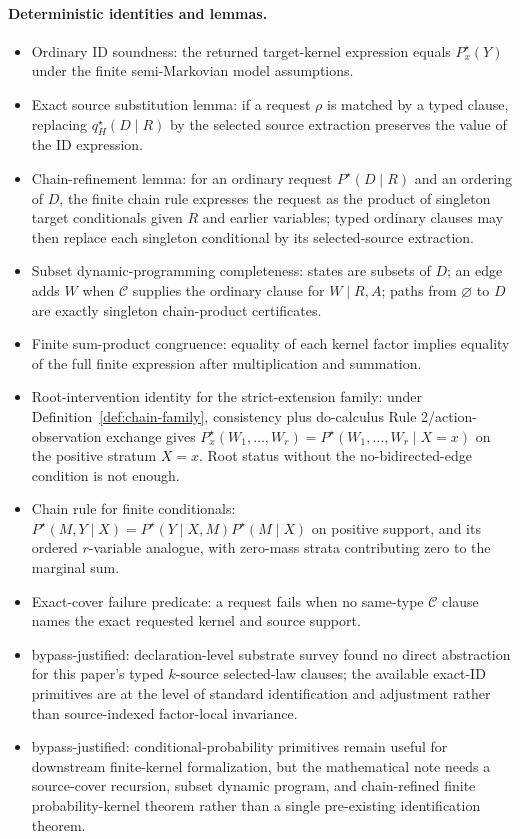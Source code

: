 \documentclass[11pt]{article}
\theoremstyle{definition}
\theoremstyle{plain}
\theoremstyle{remark}
\begin{document}
\paragraph{Deterministic identities and lemmas.}
\begin{itemize}[leftmargin=*]
\item Ordinary ID soundness: the returned target-kernel expression equals
\(P^\star_x(Y)\) under the finite semi-Markovian model assumptions.
\item Exact source substitution lemma: if a request \(\rho\) is matched by a
typed clause, replacing \(q^\star_H(D\mid R)\) by the selected source
extraction preserves the value of the ID expression.
\item Chain-refinement lemma: for an ordinary request \(P^\star(D\mid R)\)
and an ordering of \(D\), the finite chain rule expresses the request as the
product of singleton target conditionals given \(R\) and earlier variables;
typed ordinary clauses may then replace each singleton conditional by its
selected-source extraction.
\item Subset dynamic-programming completeness: states are subsets of \(D\);
an edge adds \(W\) when \(\mathcal C\) supplies the ordinary clause for
\(W\mid R,A\); paths from \(\varnothing\) to \(D\) are exactly singleton
chain-product certificates.
\item Finite sum-product congruence: equality of each kernel factor implies
equality of the full finite expression after multiplication and summation.
\item Root-intervention identity for the strict-extension family:
under Definition~\ref{def:chain-family}, consistency plus
do-calculus Rule 2/action-observation exchange gives
\(P^\star_x(W_1,\ldots,W_r)=P^\star(W_1,\ldots,W_r\mid X=x)\) on the
positive stratum \(X=x\).  Root status without the no-bidirected-edge
condition is not enough.
\item Chain rule for finite conditionals:
\(P^\star(M,Y\mid X)=P^\star(Y\mid X,M)P^\star(M\mid X)\) on positive
support, and its ordered \(r\)-variable analogue, with zero-mass strata
contributing zero to the marginal sum.
\item Exact-cover failure predicate: a request fails when no same-type
\(\mathcal C\) clause names the exact requested kernel and source support.
\item bypass-justified: declaration-level substrate survey found no direct
abstraction for this paper's typed \(k\)-source selected-law clauses; the
available exact-ID primitives are at the level of standard identification
and adjustment rather than source-indexed factor-local invariance.
\item bypass-justified: conditional-probability primitives remain useful for
downstream finite-kernel formalization, but the mathematical note needs a
source-cover recursion, subset dynamic program, and chain-refined finite
probability-kernel theorem rather than a single pre-existing identification
theorem.
\end{itemize}
\end{document}
